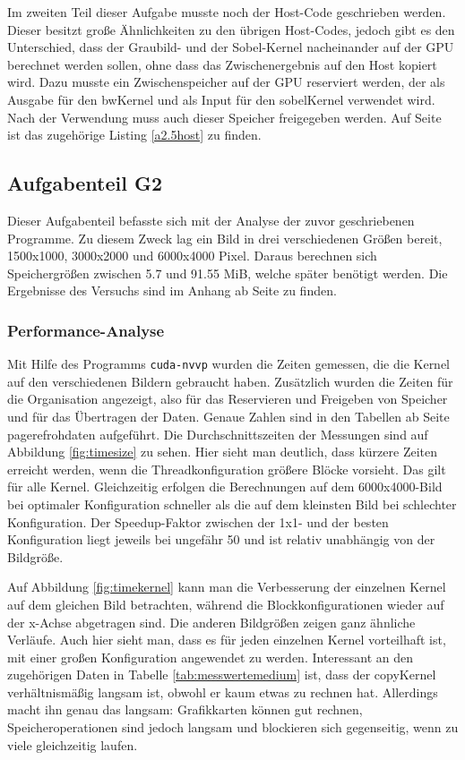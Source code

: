 \documentclass[12pt,a4paper]{scrartcl}
\begin{document}
Im zweiten Teil dieser Aufgabe musste noch der Host-Code geschrieben werden.
Dieser besitzt gro\ss{}e \"Ahnlichkeiten zu den \"ubrigen Host-Codes, jedoch gibt es den Unterschied, dass der Graubild- und der Sobel-Kernel nacheinander auf der GPU berechnet werden sollen, ohne dass das Zwischenergebnis auf den Host kopiert wird.
Dazu musste ein Zwischenspeicher auf der GPU reserviert werden, der als Ausgabe f\"ur den bwKernel und als Input f\"ur den sobelKernel verwendet wird.
Nach der Verwendung muss auch dieser Speicher freigegeben werden.
Auf Seite \pageref{a2.5host} ist das zugeh\"orige Listing \ref{a2.5host} zu finden.

\subsection{Aufgabenteil G2}
Dieser Aufgabenteil befasste sich mit der Analyse der zuvor geschriebenen Programme.
Zu diesem Zweck lag ein Bild in drei verschiedenen Gr\"o\ss{}en bereit, 1500x1000, 3000x2000 und 6000x4000 Pixel.
Daraus berechnen sich Speichergr\"o\ss{}en zwischen 5.7 und 91.55 MiB, welche sp\"ater ben\"otigt werden.
Die Ergebnisse des Versuchs sind im Anhang ab Seite \pageref{ergebnisse} zu finden.

\subsubsection{Performance-Analyse}
Mit Hilfe des Programms \texttt{cuda-nvvp} wurden die Zeiten gemessen, die die Kernel auf den verschiedenen Bildern gebraucht haben.
Zus\"atzlich wurden die Zeiten f\"ur die Organisation angezeigt, also f\"ur das Reservieren und Freigeben von Speicher und f\"ur das \"Ubertragen der Daten.
Genaue Zahlen sind in den Tabellen ab Seite pageref{rohdaten} aufgef\"uhrt.
Die Durchschnittszeiten der Messungen sind auf Abbildung \ref{fig:timesize} zu sehen.
Hier sieht man deutlich, dass k\"urzere Zeiten erreicht werden, wenn die Threadkonfiguration gr\"o\ss{}ere Bl\"ocke vorsieht.
Das gilt f\"ur alle Kernel.
Gleichzeitig erfolgen die Berechnungen auf dem 6000x4000-Bild bei optimaler Konfiguration schneller als die auf dem kleinsten Bild bei schlechter Konfiguration.
Der Speedup-Faktor zwischen der 1x1- und der besten Konfiguration liegt jeweils bei ungef\"ahr 50 und ist relativ unabh\"angig von der Bildgr\"o\ss{}e.

Auf Abbildung \ref{fig:timekernel} kann man die Verbesserung der einzelnen Kernel auf dem gleichen Bild betrachten, w\"ahrend die Blockkonfigurationen wieder auf der x-Achse abgetragen sind.
Die anderen Bildgr\"o\ss{}en zeigen ganz \"ahnliche Verl\"aufe.
Auch hier sieht man, dass es f\"ur jeden einzelnen Kernel vorteilhaft ist, mit einer gro\ss{}en Konfiguration angewendet zu werden.
Interessant an den zugeh\"origen Daten in Tabelle \ref{tab:messwertemedium} ist, dass der copyKernel verh\"altnism\"a\ss{}ig langsam ist, obwohl er kaum etwas zu rechnen hat.
Allerdings macht ihn genau das langsam:
Grafikkarten k\"onnen gut rechnen, Speicheroperationen sind jedoch langsam und blockieren sich gegenseitig, wenn zu viele gleichzeitig laufen.
\end{document}
